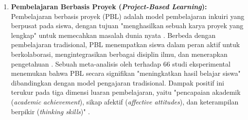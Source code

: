 \begin{enumerate}
    Pentingnya menekankan aspek kognitif dan konstruktif
    didukung oleh temuan empiris bahwa fitur-fitur inilah
    yang menjadi prediktor kesuksesan revisi tugas.
    \textcite{Kerman2024} menemukan bahwa siswa yang sukses
    (\textit{successful students}) cenderung menerima umpan
    balik yang berfokus pada \textit{identification}
    (identifikasi masalah), sedangkan umpan balik yang murni
    \textit{affective} atau sekadar deskriptif lebih banyak
    diterima oleh siswa yang kurang berhasil. Hal ini
    menunjukkan bahwa untuk meningkatkan kompetensi, sistem
    harus mendorong siswa untuk memberikan komentar yang
    tidak hanya menyentuh aspek emosional, tetapi memberikan
    identifikasi masalah dan solusi konkret.
    
    \item \textbf{Pembelajaran Berbasis Proyek (\textit{Project-Based Learning}):} Pembelajaran berbasis proyek (PBL) adalah model pembelajaran inkuiri yang
    berpusat pada siswa, dengan tujuan "menghasilkan sebuah karya proyek yang
    lengkap" untuk memecahkan masalah dunia nyata \autocite{Zhang2023}. Berbeda
    dengan pembelajaran tradisional, PBL menempatkan siswa dalam peran aktif untuk
    berkolaborasi, mengintegrasikan berbagai disiplin ilmu, dan menerapkan pengetahuan
    \autocite{Ryoo2021}. Sebuah meta-analisis oleh \textcite{Zhang2023} terhadap 66 studi eksperimental
    menemukan bahwa PBL secara signifikan "meningkatkan hasil belajar siswa"
    dibandingkan dengan model pengajaran tradisional. Dampak
    positif ini terukur pada tiga dimensi luaran pembelajaran, yaitu
    "pencapaian akademik (\textit{academic achievement}), sikap afektif
    (\textit{affective attitudes}), dan keterampilan berpikir
    (\textit{thinking skills})" \autocite{Zhang2023}.


\end{enumerate}

